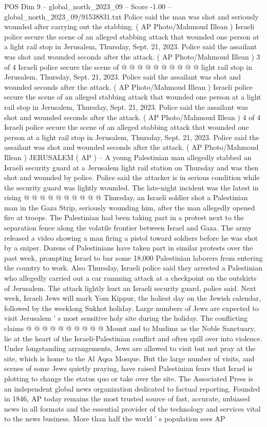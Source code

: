 \begin{textsample}{POS Dim 9 – global\_north\_2023\_09 – Score -1.00 – global\_north\_2023\_09/91538831.txt}
Police said the man was shot and seriously wounded after carrying out the stabbing. ( AP Photo/Mahmoud Illean ) Israeli police secure the scene of an alleged stabbing attack that wounded one person at a light rail stop in Jerusalem, Thursday, Sept. 21, 2023.
Police said the assailant was shot and wounded seconds after the attack. ( AP Photo/Mahmoud Illean ) 3 of 4 Israeli police secure the scene of @ @ @ @ @ @ @ @ @ @ light rail stop in Jerusalem, Thursday, Sept. 21, 2023.
Police said the assailant was shot and wounded seconds after the attack. ( AP Photo/Mahmoud Illean ) Israeli police secure the scene of an alleged stabbing attack that wounded one person at a light rail stop in Jerusalem, Thursday, Sept. 21, 2023.
Police said the assailant was shot and wounded seconds after the attack. ( AP Photo/Mahmoud Illean ) 4 of 4 Israeli police secure the scene of an alleged stabbing attack that wounded one person at a light rail stop in Jerusalem, Thursday, Sept. 21, 2023.
Police said the assailant was shot and wounded seconds after the attack. ( AP Photo/Mahmoud Illean ) JERUSALEM ( AP ) -- A young Palestinian man allegedly stabbed an Israeli security guard at a Jerusalem light rail station on Thursday and was then shot and wounded by police.
Police said the attacker is in serious condition while the security guard was lightly wounded.
The late-night incident was the latest in rising @ @ @ @ @ @ @ @ @ @ Thursday, an Israeli soldier shot a Palestinian man in the Gaza Strip, seriously wounding him, after the man allegedly opened fire at troops.
The Palestinian had been taking part in a protest next to the separation fence along the volatile frontier between Israel and Gaza.
The army released a video showing a man firing a pistol toward soldiers before he was shot by a sniper.
Dozens of Palestinians have taken part in similar protests over the past week, prompting Israel to bar some 18,000 Palestinian laborers from entering the country to work.
Also Thursday, Israeli police said they arrested a Palestinian who allegedly carried out a car ramming attack at a checkpoint on the outskirts of Jerusalem.
The attack lightly hurt an Israeli security guard, police said.
Next week, Israeli Jews will mark Yom Kippur, the holiest day on the Jewish calendar, followed by the weeklong Sukkot holiday.
Large numbers of Jews are expected to visit Jerusalem ' s most sensitive holy site during the holiday.
The conflicting claims @ @ @ @ @ @ @ @ @ @ Mount and to Muslims as the Noble Sanctuary, lie at the heart of the Israeli-Palestinian conflict and often spill over into violence.
Under longstanding arrangements, Jews are allowed to visit but not pray at the site, which is home to the Al Aqsa Mosque.
But the large number of visits, and scenes of some Jews quietly praying, have raised Palestinian fears that Israel is plotting to change the status quo or take over the site.
The Associated Press is an independent global news organization dedicated to factual reporting.
Founded in 1846, AP today remains the most trusted source of fast, accurate, unbiased news in all formats and the essential provider of the technology and services vital to the news business.
More than half the world ' s population sees AP


\end{textsample}

